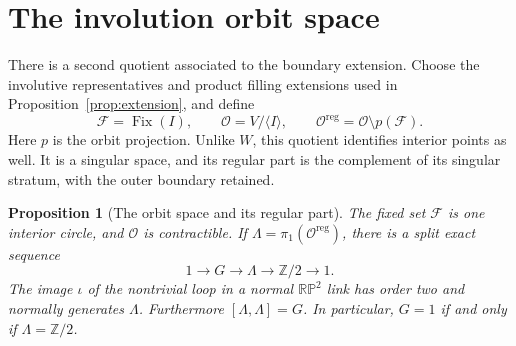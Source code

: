 \documentclass[11pt]{amsart}
\newtheorem{proposition}[theorem]{Proposition}
\theoremstyle{definition}
\theoremstyle{remark}
\newcommand{\Z}{\mathbb Z}
\begin{document}
\section{The involution orbit space}\label{sec:orbit}
There is a second quotient associated to the boundary extension.
Choose the involutive representatives and product filling extensions
used in Proposition~\ref{prop:extension}, and define
\[
 \mathcal F=\operatorname{Fix}(I),\qquad
 \mathcal O=V/\langle I\rangle,\qquad
 \mathcal O^{\mathrm{reg}}=\mathcal O\setminus p(\mathcal F).
\]
Here $p$ is the orbit projection. Unlike $W$, this quotient identifies
interior points as well. It is a singular space, and its regular part
is the complement of its singular stratum, with the outer boundary
retained.

\begin{proposition}[The orbit space and its regular part]\label{prop:orbit}
The fixed set $\mathcal F$ is one interior circle, and $\mathcal O$
is contractible. If $\Lambda=\pi_1(\mathcal O^{\mathrm{reg}})$, there
is a split exact sequence
\begin{equation}\label{eq:orbit-sequence}
 1\longrightarrow G\longrightarrow\Lambda
   \longrightarrow\Z/2\longrightarrow1.
\end{equation}
The image $\iota$ of the nontrivial loop in a normal
$\mathbb{RP}^2$ link has order two and normally generates $\Lambda$.
Furthermore $[\Lambda,\Lambda]=G$. In particular,
$G=1$ if and only if $\Lambda=\Z/2$.
\end{proposition}
\end{document}

